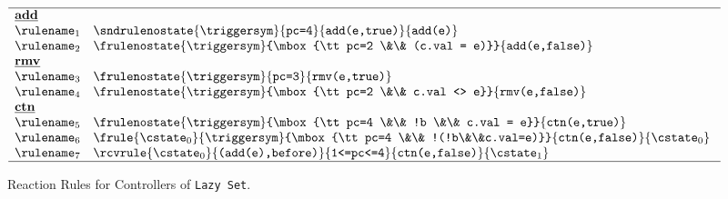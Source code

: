 \begin{figure}
  {\small
    \[
\begin{array}{ll}
\hline
\multicolumn{2}{l}{\mbox{\underline{\textbf{add}}}}\\
\rulename_1 &
 \sndrulenostate{\triggersym}{\mbox{\tt pc=4}}{\mbox{\tt add(e,true)}}{\mbox{\tt add(e)}}\\
\rulename_2 &
  \frulenostate{\triggersym}{\mbox{\tt pc=2 \&\& (c.val = e)}}{\mbox{\tt add(e,false)}}\ \\
\multicolumn{2}{l}{\mbox{\underline{\textbf{rmv}}}}\\
\rulename_3 &
  \frulenostate{\triggersym}{\mbox{\tt pc=3}}{\mbox{\tt rmv(e,true)}}\ \\
\rulename_4 &
  \frulenostate{\triggersym}{\mbox{\tt pc=2 \&\& c.val <> e}}{\mbox{\tt rmv(e,false)}}\ \\
\multicolumn{2}{l}{\mbox{\underline{\textbf{ctn}}}}\\
\rulename_5 &
 \frulenostate{\triggersym}{\mbox{\tt pc=4 \&\& !b \&\& c.val = e}}{\mbox{\tt ctn(e,true)}}\ \\
\rulename_6 &
   \frule{{\cstate}_0}{\triggersym}{\mbox{\tt pc=4 \&\& !(!b\&\&c.val=e)}}{\mbox{\tt ctn(e,false)}}{{\cstate}_0}\ \\
\rulename_7 &
 \rcvrule{{\cstate}_0}{\mbox{\tt (add(e),before)}}{\mbox{\tt 1<=pc<=4}}{\mbox{\tt ctn(e,false)}}{{\cstate}_1}\ \\
\hline  
\end{array}
\]
  }
  \vspace*{-0.5cm}
  \caption{Reaction Rules for Controllers of {\tt Lazy Set}.}
  \label{rrules:lazy:list:fig}
\end{figure}
